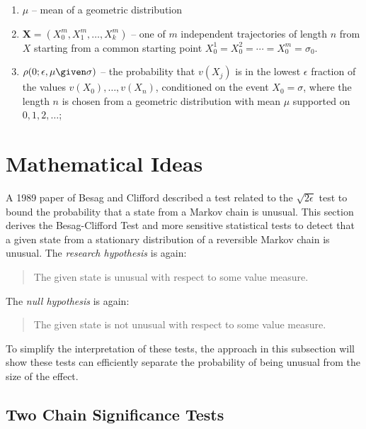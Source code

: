 \documentclass[12pt]{article}
\begin{document}
\begin{enumerate}
    \item
        \( \mu \) -- mean of a geometric distribution
    \item
        \( \mathbf{X} = (X_0^m, X_1^m, \dots, X_k^m) \) -- one of \( m \)
        independent trajectories of length \( n \) from \( X \) starting
        from a common starting point \( X_0^1 = X_0^2 = \cdots = X_0^m =
        \sigma_0 \).
    \item
        \( \rho(0; \epsilon, \mu \given \sigma) \) -- the probability
        that \( v(X_j) \) is in the lowest \( \epsilon \) fraction of
        the values \( v(X_0), \dots, v(X_n) \), conditioned on the event
        \( X_0 = \sigma \), where the length \( n \) is chosen from a
        geometric distribution with mean \( \mu \) supported on \(
        0,1,2,\dots \);
\end{enumerate}
\section*{Mathematical Ideas}

A 1989 paper of Besag and Clifford
\cite{besag89} described a test related to the \( \sqrt{2\epsilon} \)
test %
to bound the probability that a state from a Markov chain is unusual.
This section derives the Besag-Clifford Test and more sensitive
statistical tests to detect that a given state from a stationary
distribution of a reversible Markov chain is unusual.  The \emph{research
hypothesis} is again:
\begin{quote}
    The given state is unusual with respect to some value measure.
\end{quote}
The \emph{null hypothesis} is again:
\begin{quote}
    The given state is not unusual with respect to some value measure.
\end{quote}

To simplify the interpretation of these tests, the approach in this
subsection will show these tests can efficiently separate the
probability of being unusual from the size of the effect.

\subsection*{Two Chain Significance Tests}
\end{document}
